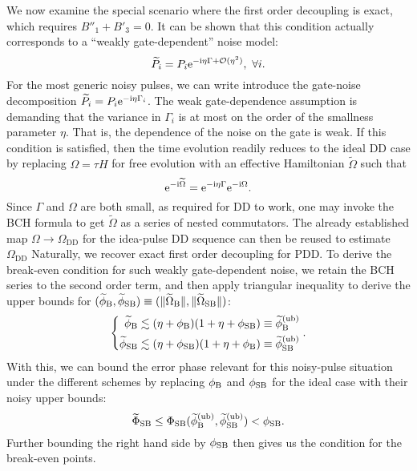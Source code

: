 \documentclass[b5paper,11pt]{article}
\newcommand{\wt}[1]{\widetilde{#1}}
\newcommand{\rDD}{\mathrm{DD}}
\begin{document}
We now examine the special scenario where the first order decoupling is exact, which requires $B''_1+B'_3=0$. It can be shown that this condition actually corresponds to a ``weakly gate-dependent'' noise model:
\begin{equation}\label{eq:gateindep1}
 \wt P_i = P_i \upe^{-\upi \eta \Gamma + \cO(\eta^2)},\ \forall i.
\end{equation}
For the most generic noisy pulses, we can write introduce the gate-noise decomposition $\wt P_i = P_i \upe^{-\upi \eta \Gamma_i}$. The weak gate-dependence assumption is demanding that the variance in $\Gamma_i$  
is at most on the order of the smallness parameter $\eta$.
 That is, the dependence of the noise on the gate is weak. If this condition is 
 satisfied, then the time evolution readily reduces to the ideal DD case by replacing $\Omega=\tau H$ for free evolution with an effective Hamiltonian $\wt\Omega$ such that
\begin{equation}
\upe^{-\upi \wt\Omega}=\upe^{-\upi \eta \Gamma}\upe^{-\upi \Omega}.
\end{equation}
Since $\Gamma$ and $\Omega$ are both small, as required for DD to work,
one may invoke the BCH formula to get $\wt\Omega$ as a series of nested commutators. 
The already established map $\Omega\to \Omega_{\rDD}$ for the idea-pulse DD sequence can then be reused to estimate $\Omega_{\rDD}$
Naturally, we recover exact first order decoupling for PDD. To derive the break-even condition for such weakly gate-dependent noise, 
we retain the BCH series to the second order term, and then apply triangular inequality to derive the upper bounds for $(\widetilde\phi_\rB,\widetilde{\phi}_\rSB) \equiv( \norm{\wt\Omega_\rB}, \norm{\wt\Omega_\rSB})$:
\begin{equation}\label{eq:comb-bound}
\left\{
\begin{aligned}
 \widetilde\phi_{\mathrm{B}} &\lesssim (\eta + \phi_{\mathrm{B}})(1+\eta + \phi_{\mathrm{SB}}) \equiv \widetilde\phi_{\mathrm{B}}^{(\mathrm{ub})}\\
 \widetilde\phi_{\mathrm{SB}} &\lesssim (\eta + \phi_{\mathrm{SB}}) (1+\eta + \phi_{\mathrm{B}})\equiv \widetilde\phi_{\mathrm{SB}}^{(\mathrm{ub})}
\end{aligned}
\right..
\end{equation}
With this, we can bound the error phase relevant for this noisy-pulse situation under the different schemes by replacing $\phi_{\mathrm{B}}$ and $\phi_{\mathrm{SB}}$ for the ideal case with their noisy upper bounds: 
\begin{equation}
 \widetilde\Phi_{\mathrm{SB}} \le \Phi_{\mathrm{SB}}(\widetilde\phi_{\mathrm{B}}^{(\mathrm{ub})}  ,\widetilde\phi_{\mathrm{SB}}^{(\mathrm{ub})} ) < \phi_{\mathrm{SB}}.
\end{equation}
Further bounding the right hand side by $\phi_{\mathrm{SB}}$ then gives us the condition for the break-even points.
\end{document}
